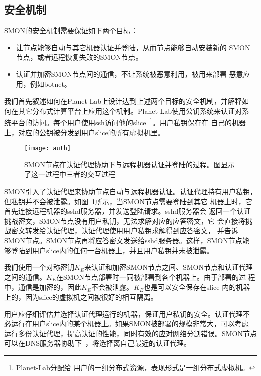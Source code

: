 \subsection{安全机制}
\label{subsec:security}

SMON的安全机制需要保证如下两个目标：

\begin{itemize}

  \item 让节点能够自动与其它机器认证并登陆，从而节点能够自动安装新的
  SMON节点，或者远程恢复失败的SMON节点。

  \item 认证并加密SMON节点间的通信，不让系统被恶意利用，被用来部署
  恶意应用，例如botnet。

\end{itemize}

我们首先叙述如何在Planet-Lab上设计达到上述两个目标的安全机制，并解释如
何在其它分布式计算平台上应用这个机制。Planet-Lab使用公钥系统来认证对系
统平台的访问。每个用户使用ssh访问他的slice~\footnote{Planet-Lab分配给
用户的一组分布式资源，表现形式是一组分布式虚拟机。}。用户私钥保存在
自己的机器上，对应的公钥被分发到用户slice的所有虚拟机里。

\begin{figure}
\centering
  \begin{minipage}{0.8\linewidth}
    \centering
    \texttt{[image: auth]}
    \caption{SMON节点在认证代理协助下与远程机器认证并登陆的过程。图显示
    了这一过程中三者的交互过程}
    \label{fig:auth}
  \end{minipage}
\end{figure}

SMON引入了认证代理来协助节点自动与远程机器认证。认证代理持有用户私钥，
但私钥并不会被泄露。如图~\ref{fig:auth}所示，当SMON节点需要登陆到其它
机器上时，它首先连接远程机器的sshd服务器，并发送登陆请求。sshd服务器会
返回一个认证挑战密文，SMON节点没有用户私钥，无法求解对应的应答密文，它
会直接将挑战密文转发给认证代理，认证代理使用用户私钥求解得到应答密文，
并告诉SMON节点。SMON节点再将应答密文发送给sshd服务器。这样，SMON节点能
够登陆到用户slice内的任何一台机器上，并且用户私钥并未被泄露。

我们使用一个对称密钥$K_E$来认证和加密SMON节点之间、SMON节点和认证代理
之间的通信。$K_E$在SMON节点部署时一同被部署到各个机器上。由于部署的过
程中，通信是加密的，因此$K_E$不会被泄露。$K_E$也是可以安全保存在slice
内的机器上的，因为slice的虚拟机之间被很好的相互隔离。

用户应仔细评估并选择认证代理运行的机器，保证用户私钥的安全。认证代理不
必运行在用户slice内的某个机器上。如果SMON被部署的规模非常大，可以考虑
运行多份认证代理，提高认证的性能，同时有效的应对网络分割错误。SMON节点
可以在DNS服务器协助下~\cite{dns_akamai}，将选择离自己最近的认证代理。


